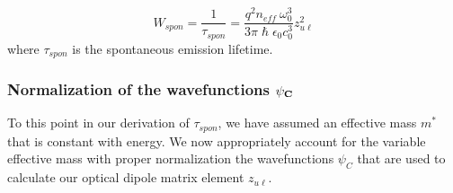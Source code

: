 \documentclass[12pt]{report}
\begin{document}
{\begin{equation}
\label{chpt1eqn:tspon}
W_{spon}=\frac{1}{\tau_{spon}}=\frac{q^2 n_{eff} \: \omega_0^3}{3 \pi \hslash \epsilon_0 c_0^3} z_{u\ell}^2
\end{equation}
where $\tau_{spon}$ is the spontaneous emission lifetime.

\subsubsection{Normalization of the wavefunctions ${\psi}_{\tiny{\textbf{C}}}$}

To this point in our derivation of $\tau_{spon}$, we have assumed an effective mass $m^*$ that is constant with energy.  We now appropriately account for the variable effective mass with proper normalization the wavefunctions $\psi_C$ that are used to calculate our optical dipole matrix element $z_{u\ell}$.

}
\end{document}
